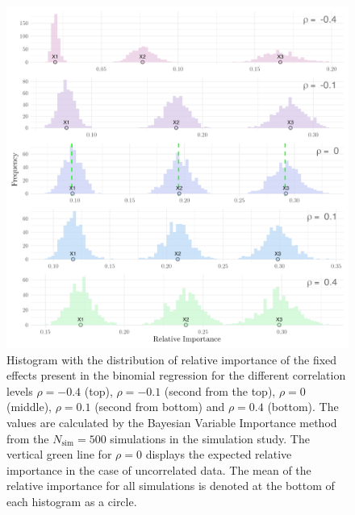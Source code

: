 \begin{figure}[H]
  \centering
  \includegraphics[width=1.1\linewidth]{Figures/Simulation study/Fixed_combined_logit.png}
  \caption[Relative importance of the fixed effects in Binomial GLMM]{Histogram with the distribution of relative importance of the fixed effects present in the binomial regression for the different correlation levels $\rho=-0.4$ (top), $\rho=-0.1$ (second from the top), $\rho=0$ (middle), $\rho=0.1$ (second from bottom) and $\rho=0.4$ (bottom). The values are calculated by the Bayesian Variable Importance method from the $N_{\text{sim}}=500$ simulations in the simulation study. The vertical green line for $\rho=0$ displays the expected relative importance in the case of uncorrelated data. The mean of the relative importance for all simulations is denoted at the bottom of each histogram as a circle.}
  \label{fig:fixed_combined_logit}
\end{figure}
